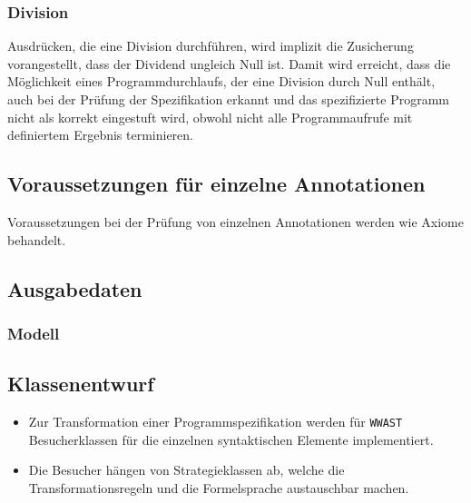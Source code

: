 \subsubsection{Division}%

Ausdrücken, die eine Division durchführen, wird implizit die Zusicherung
vorangestellt, dass der Dividend ungleich Null ist. Damit wird erreicht, dass
die Möglichkeit eines Programmdurchlaufs, der eine Division durch Null enthält,
auch bei der Prüfung der Spezifikation erkannt und das spezifizierte Programm
nicht als korrekt eingestuft wird, obwohl nicht alle Programmaufrufe mit
definiertem Ergebnis terminieren.%

\subsection{Voraussetzungen für einzelne Annotationen}%


Voraussetzungen bei der Prüfung von einzelnen Annotationen werden wie
Axiome behandelt.%

\subsection{Ausgabedaten}%

\subsubsection{Modell}%

\subsection{Klassenentwurf}%

\begin{itemize}%

    \item Zur Transformation einer Programmspezifikation werden für
    \texttt{WWAST} Besucherklassen für die einzelnen syntaktischen
    Elemente implementiert.%

    \item Die Besucher hängen von Strategieklassen ab, welche die
    Transformationsregeln und die Formelsprache austauschbar machen.%


\end{itemize}%

